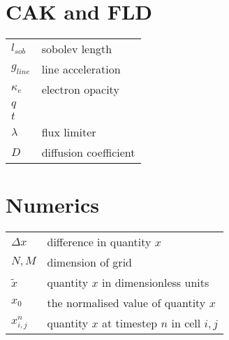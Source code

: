 \begin{multicols}{2}
\section*{CAK and FLD}
\begin{tabular}{ll}
$l_{sob}$          & sobolev length \\
$g_{line}$         & line acceleration\\
$\kappa_e$         & electron opacity \\
$q$                &   \\
$t$                &   \\
$\lambda$          & flux limiter \\
$D$                & diffusion coefficient\\
\end{tabular}

\section*{Numerics}
\begin{tabular}{ll}
$\Delta x$       & difference in quantity $x$\\
$N,M$            & dimension of grid \\
$\tilde{x}$      & quantity $x$ in dimensionless units \\
$x_0$		     & the normalised value of quantity $x$ \\
$x_{i,j}^n$	     & quantity $x$ at timestep $n$ in cell $i,j$ \\
\end{tabular}


\end{multicols}
